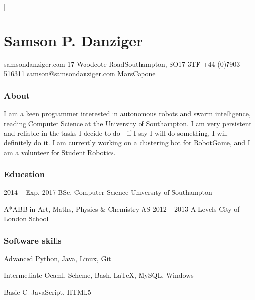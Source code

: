 \documentclass{tccv}
\begin{document}
\twocolumn[

\part{Samson P. Danziger}

\begin{multicols}{2}
    \personal
        {samsondanziger.com}
        {17 Woodcote Road\newline Southampton, SO17 3TF}
        {+44 (0)7903 516311}
        {samson@samsondanziger.com}
        {MarsCapone}
    
    \section{About}
        I am a keen programmer interested in autonomous robots and swarm intelligence, reading Computer Science at the University of Southampton. I am very persistent and reliable in the tasks I decide to do - if I say I will do something, I will definitely do it. I am currently working on a clustering bot for \href{https://robotgame.net}{RobotGame}, and I am a volunteer for Student Robotics.

\end{multicols}

\hline
\bigskip

\begin{multicols}{2}
    \section{Education}
    
        \begin{yearlist}
        
        \item{2014 -- Exp. 2017}
             {BSc. Computer Science}
             {University of Southampton}
        
        {\item[A*ABB in Art, Maths, Physics \& Chemistry AS]{2012 -- 2013}
             {A Levels}
             {City of London School}}
        
        
        \end{yearlist}
        
    \section{Software skills}
    
        \begin{factlist}
        
        \item{Advanced}
             {Python, Java, Linux, Git}
        
        \item{Intermediate}
             {Ocaml, Scheme, Bash, \LaTeX, MySQL, Windows}
        
        \item{Basic}
             {C, JavaScript, HTML5}
        
        \end{factlist}
        
\end{multicols}
\end{document}
